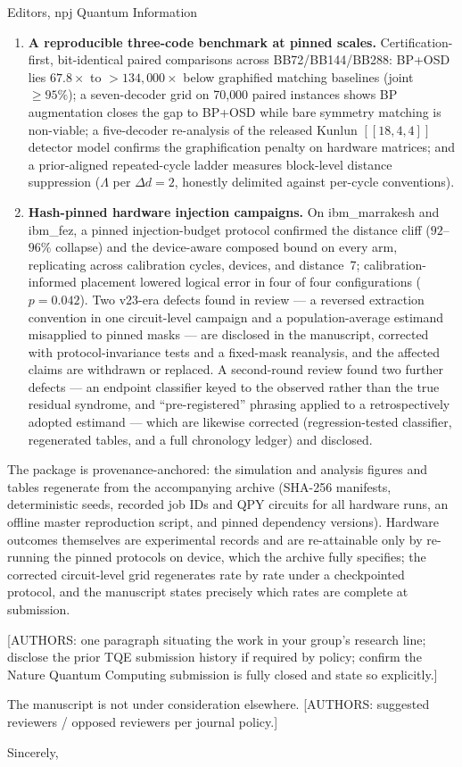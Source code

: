 \documentclass[11pt]{letter}
\begin{document}
\begin{letter}{Editors, npj Quantum Information}
\begin{enumerate}[leftmargin=1.5em,itemsep=4pt]
\item \textbf{A reproducible three-code benchmark at pinned scales.}
   Certification-first, bit-identical paired comparisons across BB72/BB144/BB288:
   BP+OSD lies $67.8\times$ to $>{134{,}000}\times$ below graphified matching
   baselines (joint $\ge95\%$); a seven-decoder grid on 70{,}000 paired
   instances shows BP augmentation closes the gap to BP+OSD while bare symmetry
   matching is non-viable; a five-decoder re-analysis of the released Kunlun
   $[[18,4,4]]$ detector model confirms the graphification penalty on hardware
   matrices; and a prior-aligned repeated-cycle ladder measures block-level
   distance suppression ($\Lambda$ per $\Delta d{=}2$, honestly delimited
   against per-cycle conventions).
\item \textbf{Hash-pinned hardware injection campaigns.} On
   ibm\_marrakesh and ibm\_fez, a pinned injection-budget protocol confirmed
   the distance cliff ($92$--$96\%$ collapse) and the device-aware composed
   bound on every arm, replicating across calibration cycles, devices, and
   distance~7; calibration-informed placement lowered logical error in four of
   four configurations ($p=0.042$). Two v23-era defects found in review --- a
   reversed extraction convention in one circuit-level campaign and a
   population-average estimand misapplied to pinned masks --- are disclosed in
   the manuscript, corrected with protocol-invariance tests and a
   fixed-mask reanalysis, and the affected claims are withdrawn or replaced.
   A second-round review found two further defects --- an endpoint
   classifier keyed to the observed rather than the true residual syndrome,
   and ``pre-registered'' phrasing applied to a retrospectively adopted
   estimand --- which are likewise corrected (regression-tested classifier,
   regenerated tables, and a full chronology ledger) and disclosed.
\end{enumerate}

The package is provenance-anchored: the simulation and analysis figures and
tables regenerate from the accompanying archive (SHA-256 manifests,
deterministic seeds, recorded job IDs and QPY circuits for all hardware runs,
an offline master reproduction script, and pinned dependency versions).
Hardware outcomes themselves are experimental records and are re-attainable
only by re-running the pinned protocols on device, which the archive fully
specifies; the corrected circuit-level grid regenerates rate by rate under a
checkpointed protocol, and the manuscript states precisely which rates are
complete at submission.

[AUTHORS: one paragraph situating the work in your group's research line;
disclose the prior TQE submission history if required by policy; confirm the
Nature Quantum Computing submission is fully closed and state so explicitly.]

The manuscript is not under consideration elsewhere. [AUTHORS: suggested
reviewers / opposed reviewers per journal policy.]

\closing{Sincerely,}
\end{letter}
\end{document}
